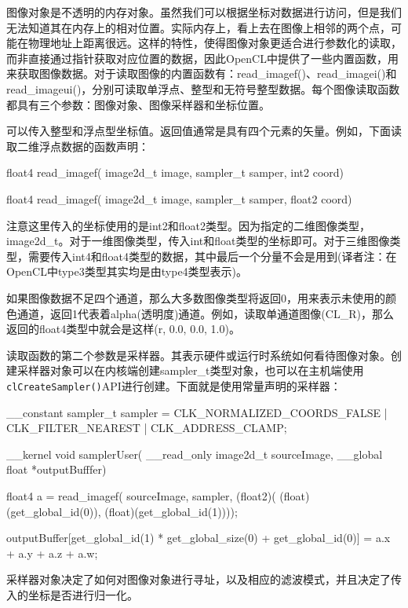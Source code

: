图像对象是不透明的内存对象。虽然我们可以根据坐标对数据进行访问，但是我们无法知道其在内存上的相对位置。实际内存上，看上去在图像上相邻的两个点，可能在物理地址上距离很远。这样的特性，使得图像对象更适合进行参数化的读取，而非直接通过指针获取对应位置的数据，因此OpenCL中提供了一些内置函数，用来获取图像数据。对于读取图像的内置函数有：read\_\allowbreak{}imagef()、read\_\allowbreak{}imagei()和read\_\allowbreak{}imageui()，分别可读取单浮点、整型和无符号整型数据。每个图像读取函数都具有三个参数：图像对象、图像采样器和坐标位置。

可以传入整型和浮点型坐标值。返回值通常是具有四个元素的矢量。例如，下面读取二维浮点数据的函数声明：

\begin{codebox}[cpp]
float4
read_imagef(
  image2d_t image,
  sampler_t samper,
  int2 coord)

float4
read_imagef(
  image2d_t image,
  sampler_t samper,
  float2 coord)
\end{codebox}

注意这里传入的坐标使用的是int2和float2类型。因为指定的二维图像类型，image2d\_\allowbreak{}t。对于一维图像类型，传入int和float类型的坐标即可。对于三维图像类型，需要传入int4和float4类型的数据，其中最后一个分量不会是用到(译者注：在OpenCL中type3类型其实均是由type4类型表示)。

如果图像数据不足四个通道，那么大多数图像类型将返回0，用来表示未使用的颜色通道，返回1代表着alpha(透明度)通道。例如，读取单通道图像(CL\_\allowbreak{}R)，那么返回的float4类型中就会是这样(r, 0.0, 0.0, 1.0)。

读取函数的第二个参数是采样器。其表示硬件或运行时系统如何看待图像对象。创建采样器对象可以在内核端创建sampler\_\allowbreak{}t类型对象，也可以在主机端使用\texttt{clCreateSampler()}API进行创建。下面就是使用常量声明的采样器：

\begin{codebox}[cpp]
__constant sampler_t sampler =
  CLK_NORMALIZED_COORDS_FALSE |
  CLK_FILTER_NEAREST          |
  CLK_ADDRESS_CLAMP;

__kernel void samplerUser(
  __read_only image2d_t sourceImage,
  __global float *outputBufffer){

  float4 a = read_imagef(
    sourceImage,
    sampler,
    (float2)(
      (float)(get_global_id(0)),
      (float)(get_global_id(1))));

  outputBuffer[get_global_id(1) * get_global_size(0) + get_global_id(0)] = a.x + a.y + a.z + a.w;
}
\end{codebox}

采样器对象决定了如何对图像对象进行寻址，以及相应的滤波模式，并且决定了传入的坐标是否进行归一化。

